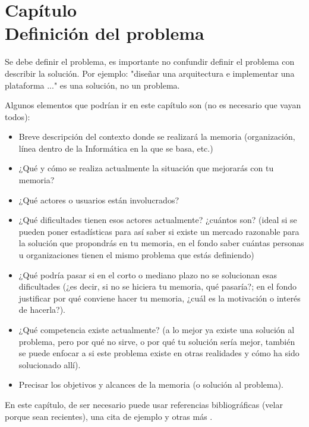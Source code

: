 \section{Capítulo \thesection \texorpdfstring{\\}\ Definición del problema}

Se debe definir el problema, es importante no confundir definir el problema con describir la solución. Por ejemplo: "diseñar una arquitectura e implementar una plataforma ..." es una solución, no un problema.

Algunos elementos que podrían ir en este capítulo son (no es necesario que vayan todos):
\begin{itemize}
    \item Breve descripción del contexto donde se realizará la memoria (organización, línea dentro de la Informática en la que se basa, etc.)
    \item ¿Qué y cómo se realiza actualmente la situación que mejorarás con tu memoria?
    \item ¿Qué actores o usuarios están involucrados?
    \item ¿Qué dificultades tienen esos actores actualmente? ¿cuántos son? (ideal si se pueden poner estadísticas para así saber si existe un mercado razonable para la solución que propondrás en tu memoria, en el fondo saber cuántas personas u organizaciones tienen el mismo problema que estás definiendo)
    \item ¿Qué podría pasar si en el corto o mediano plazo no se solucionan esas dificultades (¿es decir, si no se hiciera tu memoria, qué pasaría?; en el fondo justificar por qué conviene hacer tu memoria, ¿cuál es la motivación o interés de hacerla?).
    \item ¿Qué competencia existe actualmente? (a lo mejor ya existe una solución al problema, pero por qué no sirve, o por qué tu solución sería mejor, también se puede enfocar a si este problema existe en otras realidades y cómo ha sido solucionado allí).
    \item Precisar los objetivos y alcances de la memoria (o solución al problema).
\end{itemize}

En este capítulo, de ser necesario puede usar referencias bibliográficas (velar porque sean recientes), una cita de ejemplo \cite{schwab2002cure} y otras más \cite{gettelfinger2004will,beaumont1990patient}.

